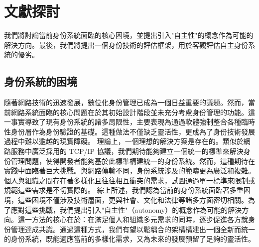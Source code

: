 
\chapter{文獻探討}
我們將討論當前身份系統面臨的核心困境，並提出引入"自主性"的概念作為可能的解決方向。最後，我們將提出一個身份技術的評估框架，用於客觀評估自主身份系統的優劣。
\section{身份系統的困境}
隨著網路技術的迅速發展，數位化身份管理已成為一個日益重要的議題。然而，當前網路系統面臨的核心問題在於其初始設計階段並未充分考慮身份管理的功能\cite{cameron2005laws}。這一事實導致了現有身份系統的諸多局限性，主要表現為通過軟體強制整合各種臨時性身份層作為身份驗證的基礎。這種做法不僅缺乏靈活性，更成為了身份技術發展過程中難以逾越的現實障礙。\newline
理論上，一個理想的解決方案是存在的。類似於網路服務中廣泛採用的 TCP/IP 協議，我們期待能夠建立一個統一的標準來解決身份管理問題，使得開發者能夠基於此標準構建統一的身份系統。然而，這種期待在實踐中面臨著巨大挑戰。與網路傳輸不同，身份系統涉及的範疇更為廣泛和複雜。個人與組織之間存在著多樣化且往往相互衝突的需求，試圖通過單一標準來限制或規範這些需求是不切實際的。\newline
綜上所述，我們認為當前的身份系統面臨著多重困境，這些困境不僅涉及技術層面，更與社會、文化和法律等諸多方面密切相關。為了應對這些挑戰，我們提出引入"自主性"（autonomy）的概念作為可能的解決方向。這一方法的核心在於：在滿足個人和組織多元需求的同時，逐步促進各方就身份管理達成共識。通過這種方式，我們有望以鬆耦合的架構構建出一個全新而統一的身份系統，既能適應當前的多樣化需求，又為未來的發展預留了足夠的靈活性。
